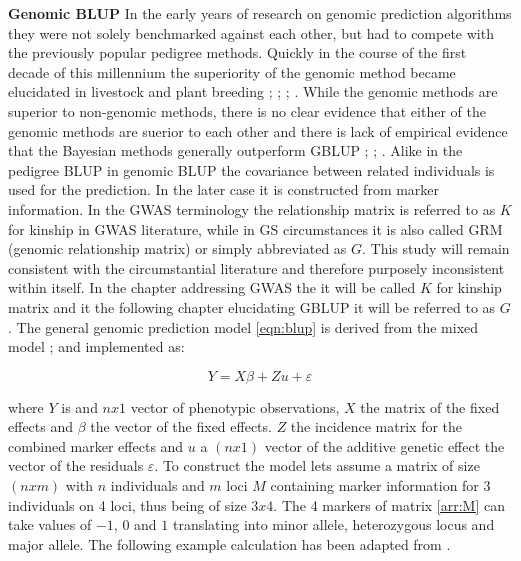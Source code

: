\textbf{Genomic BLUP} \newline In the early years of research on genomic prediction algorithms they were not
solely benchmarked against each other, but had to compete with the previously popular pedigree
methods. Quickly in the course of the first decade of this millennium the superiority of the genomic method
became elucidated in livestock and plant breeding \cite{habier2007impact}; \cite{vanraden2008efficient};
\cite{vanraden2008reliability}; \cite{harris2009genomic}.  While the genomic methods are superior to
non-genomic methods, there is no clear evidence that either of the genomic methods are suerior to each other
and there is lack of empirical evidence that the Bayesian methods generally outperform GBLUP
\cite{moser2009comparison} ; \cite{bernardo2010breeding}; \cite{azodi2019}.  Alike in the pedigree BLUP in
genomic BLUP the covariance between related individuals is used for the prediction. In the later case it is
constructed from marker information. In the GWAS terminology the relationship matrix is referred to as $K$ for
kinship in GWAS literature, while in GS circumstances it is also called GRM (genomic relationship matrix) or
simply abbreviated as $G$. This study will remain consistent with the circumstantial literature and therefore
purposely inconsistent within itself. In the chapter addressing GWAS the it will be called $K$ for kinship
matrix and it the following chapter elucidating GBLUP it will be referred to as $G$.  The general genomic
prediction model \ref{eqn:blup} is derived from the mixed model \cite{henderson1975best};
\cite{vanraden2008efficient} and implemented as:

\begin{equation}
Y = X \beta  +  Zu + \varepsilon
  \label{eqn:blup}
\end{equation}

where $Y$ is and $nx1$ vector of phenotypic observations, $X$ the matrix of the fixed effects and $\beta$ the
vector of the fixed effects. $Z$ the incidence matrix for the combined marker effects and $u$ a $(nx1)$ vector
of the additive genetic effect the vector of the residuals $\varepsilon$.  To construct the model lets assume
a matrix of size $(n x m)$ with $n$ individuals and $m$ loci $M$ containing marker information for 3
individuals on 4 loci, thus being of size $3x4$. The 4 markers of matrix \ref{arr:M} can take values of $-1$,
$0$ and $1$ translating into minor allele, heterozygous locus and major allele. The following example
calculation has been adapted from \cite{isik2013}.

